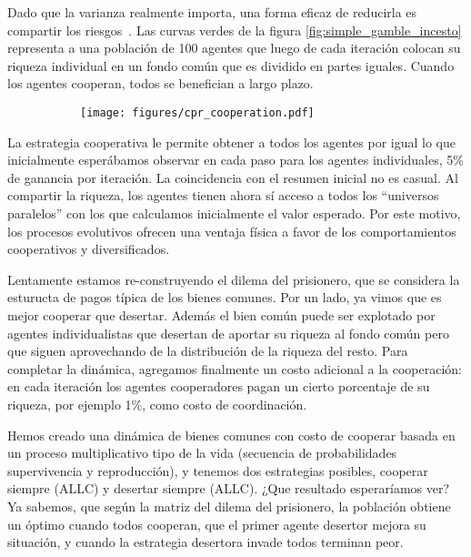 \documentclass[a4paper,10pt]{article}
\begin{document}

Dado que la varianza realmente importa, una forma eficaz de reducirla es compartir los riesgos~\cite{yaari2010-cooperationEvolution, peters-cooperation}.
Las curvas verdes de la figura \ref{fig:simple_gamble_incesto} representa a una población de 100 agentes que luego de cada iteración colocan su riqueza individual en un fondo común que es dividido en partes iguales.
Cuando los agentes cooperan, todos se benefician a largo plazo.

\begin{figure}[ht!]
    \centering
    \begin{subfigure}[b]{0.45\textwidth}
    \texttt{[image: figures/cpr\_cooperation.pdf]}
    \end{subfigure}
    \caption{}
    \label{fig:cpr_cooperation}
\end{figure}

La estrategia cooperativa le permite obtener a todos los agentes por igual lo que inicialmente esperábamos observar en cada paso para los agentes individuales, 5\% de ganancia por iteración.
La coincidencia con el resumen inicial no es casual.
Al compartir la riqueza, los agentes tienen ahora sí acceso a todos los ``universos paralelos'' con los que calculamos inicialmente el valor esperado.
Por este motivo, los procesos evolutivos ofrecen una ventaja física a favor de los comportamientos cooperativos y diversificados.


Lentamente estamos re-construyendo el dilema del prisionero, que se considera la esturucta de pagos típica de los bienes comunes.
Por un lado, ya vimos que es mejor cooperar que desertar.
Además el bien común puede ser explotado por agentes individualistas que desertan de aportar su riqueza al fondo común pero que siguen aprovechando de la distribución de la riqueza del resto.
Para completar la dinámica, agregamos finalmente un costo adicional a la cooperación: en cada iteración los agentes cooperadores pagan un cierto porcentaje de su riqueza, por ejemplo 1\%, como costo de coordinación.


Hemos creado una dinámica de bienes comunes con costo de cooperar basada en un proceso multiplicativo tipo de la vida (secuencia de probabilidades supervivencia y reproducción), y tenemos dos estrategias posibles, cooperar siempre (ALLC) y desertar siempre (ALLC).
¿Que resultado esperaríamos ver?
Ya sabemos, que según la matriz del dilema del prisionero, la población obtiene un óptimo cuando todos cooperan, que el primer agente desertor mejora su situación, y cuando la estrategia desertora invade todos terminan peor.
\end{document}
